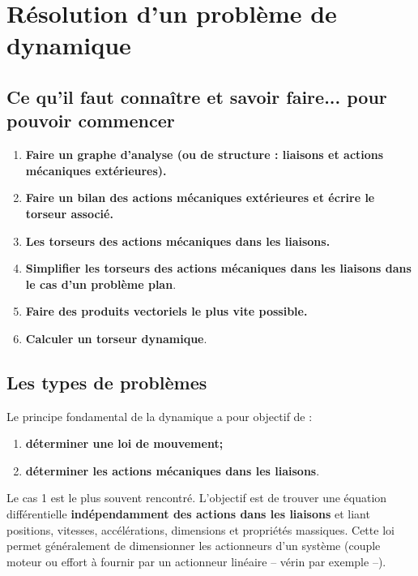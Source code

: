 %
{}
\setchapterpreamble[u]{\margintoc}

\chapter{Résolution d'un problème de dynamique}



\setcounter{section}{0}
\section{Ce qu'il faut connaître et savoir faire... pour pouvoir commencer}
\begin{enumerate}
\item \textbf{Faire un graphe d'analyse (ou de structure : liaisons et actions mécaniques extérieures).}
\item \textbf{Faire un bilan des actions mécaniques extérieures et écrire le torseur associé.}
\item \textbf{Les torseurs des actions mécaniques dans les liaisons.}
\item \textbf{Simplifier les torseurs des actions mécaniques dans les liaisons dans le cas d'un problème plan}.
\item \textbf{Faire des produits vectoriels le plus vite possible.}
\item \textbf{Calculer un torseur dynamique}.
\end{enumerate}



\section{Les types de problèmes}

Le principe fondamental de la dynamique a pour objectif de :
\begin{enumerate}
\item \textbf{déterminer une loi de mouvement;}
\item \textbf{déterminer les actions mécaniques dans les liaisons}.
\end{enumerate}

Le cas 1 est le plus souvent rencontré. L'objectif est de trouver une équation différentielle \textbf{indépendamment des actions dans les liaisons} et liant positions, vitesses, accélérations, dimensions et propriétés massiques. 
Cette loi permet généralement de dimensionner les actionneurs d'un système (couple moteur ou effort à fournir par un actionneur linéaire -- vérin par exemple --).

